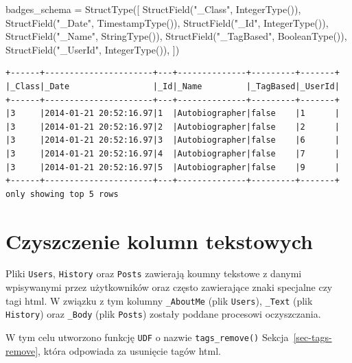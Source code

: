 \documentclass[
  letterpaper,
  DIV=11,
  numbers=noendperiod]{scrreprt}
\newenvironment{Shaded}{\begin{snugshade}}{\end{snugshade}}
\newcommand{\NormalTok}[1]{\textcolor[rgb]{0.00,0.23,0.31}{#1}}
\newcommand{\OperatorTok}[1]{\textcolor[rgb]{0.37,0.37,0.37}{#1}}
\newcommand{\StringTok}[1]{\textcolor[rgb]{0.13,0.47,0.30}{#1}}
\begin{document}
\small

\begin{Shaded}
\begin{Highlighting}[]
\NormalTok{badges\_schema }\OperatorTok{=}\NormalTok{ StructType([}
\NormalTok{    StructField(}\StringTok{"\_Class"}\NormalTok{, IntegerType()),}
\NormalTok{    StructField(}\StringTok{"\_Date"}\NormalTok{, TimestampType()),}
\NormalTok{    StructField(}\StringTok{"\_Id"}\NormalTok{, IntegerType()),}
\NormalTok{    StructField(}\StringTok{"\_Name"}\NormalTok{, StringType()),}
\NormalTok{    StructField(}\StringTok{"\_TagBased"}\NormalTok{, BooleanType()),}
\NormalTok{    StructField(}\StringTok{"\_UserId"}\NormalTok{, IntegerType()),}
\NormalTok{])}
\end{Highlighting}
\end{Shaded}

\begin{verbatim}
+------+----------------------+---+--------------+---------+-------+
|_Class|_Date                 |_Id|_Name         |_TagBased|_UserId|
+------+----------------------+---+--------------+---------+-------+
|3     |2014-01-21 20:52:16.97|1  |Autobiographer|false    |1      |
|3     |2014-01-21 20:52:16.97|2  |Autobiographer|false    |2      |
|3     |2014-01-21 20:52:16.97|3  |Autobiographer|false    |6      |
|3     |2014-01-21 20:52:16.97|4  |Autobiographer|false    |7      |
|3     |2014-01-21 20:52:16.97|5  |Autobiographer|false    |9      |
+------+----------------------+---+--------------+---------+-------+
only showing top 5 rows
\end{verbatim}

\normalsize

\hypertarget{czyszczenie-kolumn-tekstowych}{%
\section{Czyszczenie kolumn
tekstowych}\label{czyszczenie-kolumn-tekstowych}}

Pliki \texttt{Users}, \texttt{History} oraz \texttt{Posts} zawierają
koumny tekstowe z danymi wpisywanymi przez użytkowników oraz często
zawierające znaki specjalne czy tagi html. W związku z tym kolumny
\texttt{\_AboutMe} (plik \texttt{Users}), \texttt{\_Text} (plik
\texttt{History}) oraz \texttt{\_Body} (plik \texttt{Posts}) zostały
poddane procesowi oczyszczania.

W tym celu utworzono funkcję \texttt{UDF} o nazwie
\texttt{tags\_remove()} Sekcja~\ref{sec-tags-remove}, która odpowiada za
usunięcie tagów html.
\end{document}
